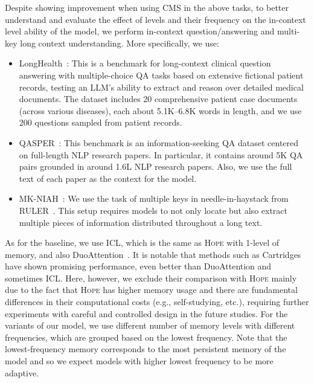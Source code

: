 \documentclass{article}
\newcommand{\citep}{\parencite}
\newcommand{\head}[1]{\vspace{1.7mm}\noindent{{\textcolor{c4}{\bf #1.}}}}
\newcommand{\model}[0]{\textsc{Hope}}
\begin{document}
{\head{The Effect of Levels on In-context Learning}
Despite showing improvement when using CMS in the above tasks, to better understand and evaluate the effect of levels and their frequency on the in-context level ability of the model, we perform in-context question/answering and multi-key long context understanding. More specifically, we use:
\begin{itemize}
    \item LongHealth~\citep{adams2025longhealth}: This is a benchmark for long-context clinical question answering with multiple-choice QA tasks based on extensive fictional patient records, testing an LLM’s ability to extract and reason over detailed medical documents. The dataset includes 20 comprehensive patient case documents (across various diseases), each about 5.1K–6.8K words in length, and we use 200 questions sampled from patient records. 
    \item QASPER~\citep{dasigi2021dataset}: This benchmark is an information-seeking QA dataset centered on full-length NLP research papers. In particular, it contains around 5K QA pairs grounded in around 1.6L NLP research papers. Also, we use the full text of each paper as the context for the model. 
    \item MK-NIAH~\citep{hsieh2024ruler}: We use the task of multiple keys in needle-in-haystack from RULER~\citep{hsieh2024ruler}. This setup requires models to not only locate but also extract multiple pieces of information distributed throughout a long text. 
\end{itemize}
As for the baseline, we use ICL, which is the same as \model{} with 1-level of memory, and also DuoAttention~\citep{xiao2025duoattention}. It is notable that methods such as Cartridges~\citep{eyuboglu2025cartridges} have shown promising performance, even better than DuoAttention and sometimes ICL. Here, however, we exclude their comparison with \model{} mainly due to the fact that \model{} has higher memory usage and there are fundamental differences in their computational costs (e.g., self-studying, etc.), requiring further experiments with careful and controlled design in the future studies. For the variants of our model, we use different number of memory levels with different frequencies, which are grouped based on the lowest frequency. Note that the lowest-frequency memory corresponds to the most persistent memory of the model and so we expect models with higher lowest frequency to be more adaptive.  

}
\end{document}
